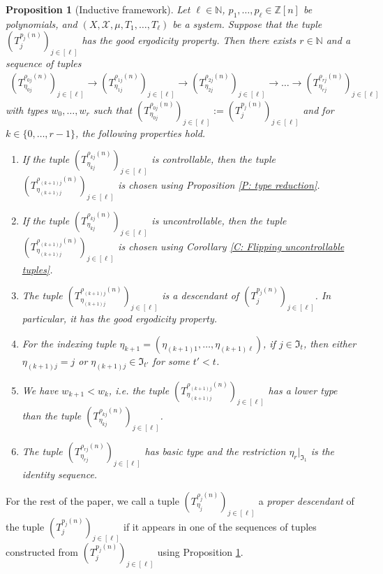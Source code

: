 \documentclass[11pt]{amsart}
\newtheorem{proposition}[lemma]{Proposition}
\theoremstyle{definition}
\newcommand{\N}{{\mathbb N}}
\newcommand{\Z}{{\mathbb Z}}
\newcommand{\CX}{{\mathcal X}}
\newcommand{\FI}{{\mathfrak I}}
\newcommand{\brac}[1]{\mathopen{}\left( #1 \mathclose{}\right)}
\begin{document}
\begin{proposition}[Inductive framework]\label{P: induction scheme}
Let $\ell\in\N$, $p_1, \ldots, p_\ell\in\Z[n]$ be polynomials, and $(X, \CX, \mu, T_1, \ldots, T_\ell)$ be a system. Suppose that the tuple $\brac{T_j^{p_j(n)}}_{j\in[\ell]}$ has the good ergodicity property. Then there exists $r\in\N$ and a sequence of tuples
\begin{align*}%
    \brac{T_{\eta_{0j}}^{\rho_{0j}(n)}}_{j\in[\ell]} \to \brac{T_{\eta_{1j}}^{\rho_{1j}(n)}}_{j\in[\ell]} \to \brac{T_{\eta_{2j}}^{\rho_{2j}(n)}}_{j\in[\ell]}\to \ldots \to \brac{T_{\eta_{rj}}^{\rho_{rj}(n)}}_{j\in[\ell]}
\end{align*}
with types $w_0, \ldots, w_r$ such that $\brac{T_{\eta_{0j}}^{\rho_{0j}(n)}}_{j\in[\ell]} := \brac{T_j^{p_j(n)}}_{j\in[\ell]}$ and for $k\in\{0, \ldots, r-1\}$, the following properties hold.
\begin{enumerate}
    \item If the tuple $\brac{T_{\eta_{kj}}^{\rho_{kj}(n)}}_{j\in[\ell]}$ is controllable, then the tuple $\brac{T_{\eta_{(k+1)j}}^{\rho_{(k+1)j}(n)}}_{j\in[\ell]}$ is chosen using Proposition \ref{P: type reduction}.
    \item If the tuple $\brac{T_{\eta_{kj}}^{\rho_{kj}(n)}}_{j\in[\ell]}$ is uncontrollable, then the tuple $\brac{T_{\eta_{(k+1)j}}^{\rho_{(k+1)j}(n)}}_{j\in[\ell]}$ is chosen using Corollary \ref{C: Flipping uncontrollable tuples}.
    \item The tuple $\brac{T_{\eta_{(k+1)j}}^{\rho_{(k+1)j}(n)}}_{j\in[\ell]}$ is a descendant of $\brac{T_j^{p_j(n)}}_{j\in[\ell]}$. In particular, it has the good ergodicity property.
    \item For the indexing tuple $\eta_{k+1}=(\eta_{(k+1)1}, \ldots, \eta_{(k+1)\ell})$, if $ j\in\FI_t$,  then either $\eta_{(k+1)j} = j$ or $\eta_{(k+1)j}\in\FI_{t'}$ for some $t'<t$.
    \item We have $w_{k+1}<w_k$, i.e. the tuple $\brac{T_{\eta_{(k+1)j}}^{\rho_{(k+1)j}(n)}}_{j\in[\ell]}$ has a lower type than the tuple $\brac{T_{\eta_{kj}}^{\rho_{kj}(n)}}_{j\in[\ell]}$.
    \item The tuple $\brac{T_{\eta_{rj}}^{\rho_{rj}(n)}}_{j\in[\ell]}$ has basic type and the restriction $\eta_r|_{\FI_1}$ is the identity sequence.
\end{enumerate}
\end{proposition}

For the rest of the paper, we call a tuple $\brac{T_{\eta_{j}}^{\rho_{j}(n)}}_{j\in[\ell]}$ a \textit{proper descendant} of the tuple $\brac{T_j^{p_j(n)}}_{j\in[\ell]}$ if it appears in one of the sequences of tuples constructed from $\brac{T_j^{p_j(n)}}_{j\in[\ell]}$ using Proposition \ref{P: induction scheme}.
\end{document}
